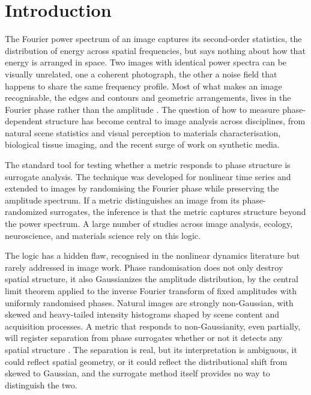 \documentclass[a4paper,12pt]{article}
\begin{document}
\section{Introduction}

The Fourier power spectrum of an image captures its second-order statistics, the distribution of energy across spatial frequencies, but says nothing about how that energy is arranged in space. Two images with identical power spectra can be visually unrelated, one a coherent photograph, the other a noise field that happens to share the same frequency profile. Most of what makes an image recognisable, the edges and contours and geometric arrangements, lives in the Fourier phase rather than the amplitude \citep{oppenheim1981}. The question of how to measure phase-dependent structure has become central to image analysis across disciplines, from natural scene statistics and visual perception to materials characterisation, biological tissue imaging, and the recent surge of work on synthetic media.

The standard tool for testing whether a metric responds to phase structure is surrogate analysis. The technique was developed for nonlinear time series \citep{theiler1992} and extended to images by randomising the Fourier phase while preserving the amplitude spectrum. If a metric distinguishes an image from its phase-randomized surrogates, the inference is that the metric captures structure beyond the power spectrum. A large number of studies across image analysis, ecology, neuroscience, and materials science rely on this logic.

The logic has a hidden flaw, recognised in the nonlinear dynamics literature but rarely addressed in image work. Phase randomisation does not only destroy spatial structure, it also Gaussianizes the amplitude distribution, by the central limit theorem applied to the inverse Fourier transform of fixed amplitudes with uniformly randomised phases. Natural images are strongly non-Gaussian, with skewed and heavy-tailed intensity histograms shaped by scene content and acquisition processes. A metric that responds to non-Gaussianity, even partially, will register separation from phase surrogates whether or not it detects any spatial structure \citep{rapp1994}. The separation is real, but its interpretation is ambiguous, it could reflect spatial geometry, or it could reflect the distributional shift from skewed to Gaussian, and the surrogate method itself provides no way to distinguish the two.
\end{document}
